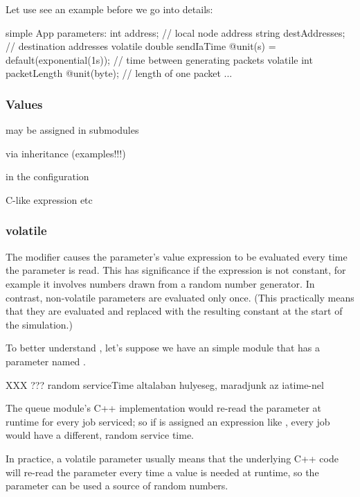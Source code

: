 Let use see an example before we go into details:

\begin{ned}
simple App
{
    parameters:
        int address;  // local node address
        string destAddresses;  // destination addresses
        volatile double sendIaTime @unit(s) = default(exponential(1s));
                               // time between generating packets
        volatile int packetLength @unit(byte);  // length of one packet
    ...
}
\end{ned}

\subsubsection{Values}

may be assigned in submodules

via inheritance  (examples!!!)

in the configuration

C-like expression etc

\subsubsection{volatile}

The  modifier causes the parameter's value expression to
be evaluated every time the parameter is read. This has significance if the
expression is not constant, for example it involves numbers drawn from a
random number generator. In contrast, non-volatile parameters are evaluated
only once. (This practically means that they are evaluated and replaced
with the resulting constant at the start of the simulation.)

To better understand , let's suppose we have an
 simple module that has a  parameter
named .

XXX ??? random serviceTime altalaban hulyeseg, maradjunk az iatime-nel

The queue module's C++ implementation would re-read the 
parameter at runtime for every job serviced; so if  is
assigned an expression like , every job would have
a different, random service time.

In practice, a volatile parameter usually means that the underlying C++
code will re-read the parameter every time a value is needed at runtime, so
the parameter can be used a source of random numbers.

